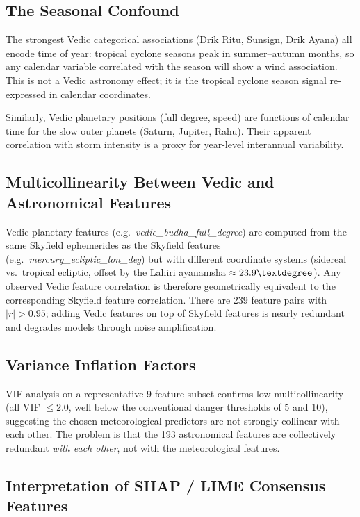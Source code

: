 \documentclass[12pt,a4paper]{article}
\begin{document}
\subsection{The Seasonal Confound}
\label{sec:confound}

The strongest Vedic categorical associations (Drik Ritu, Sunsign, Drik Ayana)
all encode time of year: tropical cyclone seasons peak in summer--autumn months,
so any calendar variable correlated with the season will show a wind association.
This is not a Vedic astronomy effect; it is the tropical cyclone season signal
re-expressed in calendar coordinates.

Similarly, Vedic planetary positions (full degree, speed) are functions of calendar
time for the slow outer planets (Saturn, Jupiter, Rahu). Their apparent correlation
with storm intensity is a proxy for year-level interannual variability.

\subsection{Multicollinearity Between Vedic and Astronomical Features}

Vedic planetary features (e.g.\ \textit{vedic\_budha\_full\_degree}) are computed
from the same Skyfield ephemerides as the Skyfield features
(e.g.\ \textit{mercury\_ecliptic\_lon\_deg}) but with different coordinate systems
(sidereal vs.\ tropical ecliptic, offset by the Lahiri ayanamsha $\approx 23.9\textdegree$).
Any observed Vedic feature correlation is therefore geometrically equivalent to
the corresponding Skyfield feature correlation. There are 239 feature pairs with
$|r| > 0.95$; adding Vedic features on top of Skyfield features is nearly redundant
and degrades models through noise amplification.

\subsection{Variance Inflation Factors}

VIF analysis on a representative 9-feature subset confirms low multicollinearity
(all VIF $\leq 2.0$, well below the conventional danger thresholds of 5 and 10),
suggesting the chosen meteorological predictors are not strongly collinear with
each other. The problem is that the 193 astronomical features are collectively
redundant \emph{with each other}, not with the meteorological features.

\subsection{Interpretation of SHAP / LIME Consensus Features}
\end{document}
